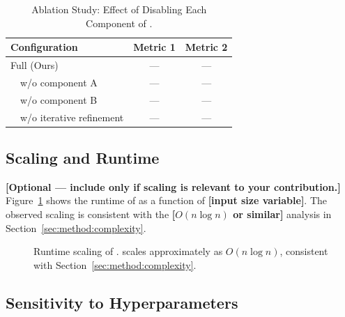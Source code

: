 \begin{table}[!t]
\caption{Ablation Study: Effect of Disabling Each Component of \method{}.}
\label{tab:ablation}
\centering
\small
\begin{tabular}{lcc}
\toprule
Configuration & Metric 1 & Metric 2 \\
\midrule
Full \method{} (Ours)             & --- & --- \\
~~w/o component A                 & --- & --- \\
~~w/o component B                 & --- & --- \\
~~w/o iterative refinement        & --- & --- \\
\bottomrule
\end{tabular}
\end{table}

\subsection{Scaling and Runtime}
\label{sec:experiments:scaling}

\textbf{[Optional --- include only if scaling is relevant to your
contribution.]} Figure~\ref{fig:scaling} shows the runtime of \method{}
as a function of \textbf{[input size variable]}. The observed scaling is
consistent with the \textbf{[\(O(n \log n)\) or similar]} analysis in
Section~\ref{sec:method:complexity}.

\begin{figure}[!t]
    \centering
    \caption{Runtime scaling of \method{}. \method{} scales approximately
    as \(O(n \log n)\), consistent with Section~\ref{sec:method:complexity}.}
    \label{fig:scaling}
\end{figure}

\subsection{Sensitivity to Hyperparameters}
\label{sec:experiments:sensitivity}


